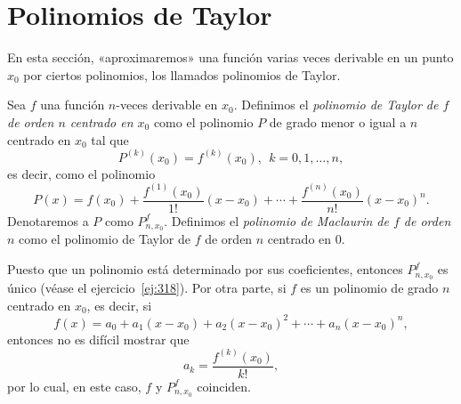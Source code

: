\documentclass[12pt,a4paper]{book}
\begin{document}
    \section{Polinomios de Taylor}

    En esta sección, «aproximaremos» una función varias veces derivable en
    un punto $x_{0}$ por ciertos polinomios, los llamados polinomios de Taylor.

    \begin{definicion}\label{def:55}
        Sea $f$ una función $n$-veces derivable
        en $x_{0}$. Definimos el \textit{polinomio de Taylor de $f$ de orden $n$ centrado en $x_{0}$}
        como el polinomio $P$ de grado menor o igual a $n$ centrado en $x_{0}$ tal que
        \begin{equation}\label{eq:5.50}
            P^{(k)}(x_{0})=f^{(k)}(x_{0}),\ \ k=0,1,\ldots,n,
        \end{equation}
        es decir, como el polinomio
        \begin{equation*}
            P(x)=f(x_{0})+\frac{f^{(1)}(x_{0})}{1!}(x-x_{0})+\cdots+\frac{f^{(n)}(x_{0})}{n!}(x-x_{0})^{n}.
        \end{equation*}
        Denotaremos a $P$ como $P^{f}_{n,x_{0}}$. Definimos el \textit{polinomio de Maclaurin de $f$ de
        orden $n$} como el polinomio de Taylor de $f$ de orden $n$ centrado en $0$.
    \end{definicion}

    Puesto que un polinomio está determinado por sus coeficientes, entonces
    $P^{f}_{n,x_{0}}$ es único (véase el ejercicio~\ref{ej:318}). Por otra parte, si $f$ es un polinomio
    de grado $n$ centrado en $x_{0}$, es decir, si
    \begin{equation*}
        f(x)=a_{0}+a_{1}(x-x_{0})+a_{2}(x-x_{0})^{2}+\cdots+a_{n}(x-x_{0})^{n},
    \end{equation*}
    entonces no es difícil mostrar que
    \begin{equation*}
        a_{k}=\frac{f^{(k)}(x_{0})}{k!},
    \end{equation*}
    por lo cual, en este caso, $f$ y $P^{f}_{n,x_{0}}$ coinciden.
\end{document}
